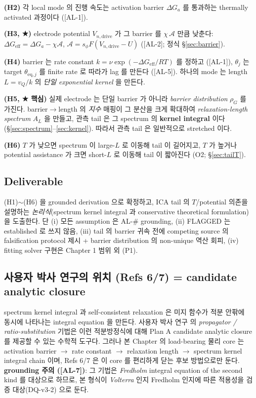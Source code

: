 \documentclass[11pt,a4paper]{article}
\newcommand{\eff}{\mathrm{eff}}
\newcommand{\eq}{\mathrm{eq}}
\newcommand{\dimedrive}{\mathrm{drive}}
\newcommand{\AL}[1]{\textsf{[AL-#1]}}
\begin{document}
\textbf{(H2)} 각 local mode 의 진행 속도는 activation barrier $\Delta G_{a}$ 를 통과하는
thermally activated 과정이다 (\AL{1}).

\textbf{(H3, ★)} electrode potential $V_{n,\dimedrive}$ 가 그 barrier 를 $\chi\,\mathcal A$
만큼 낮춘다: $\Delta G_\eff = \Delta G_a - \chi\mathcal A$, $\mathcal A=s_\phi F(V_{n,\dimedrive}-U)$
(\AL{2}; 정식 \S\ref{sec:barrier}).

\textbf{(H4)} barrier 는 rate constant $k=\nu\exp(-\Delta G_\eff/RT)$ 를 정하고 (\AL{1}),
$\theta_j$ 는 target $\theta_{\eq,j}$ 를 finite rate 로 따라가 lag 를 만든다 (\AL{5}).
하나의 mode 는 length $L=v_Q/k$ 의 \emph{단일 exponential kernel} 을 만든다.

\textbf{(H5, ★ 핵심)} 실제 electrode 는 단일 barrier 가 아니라 \emph{barrier
distribution} $\rho_G$ 를 가진다. barrier$\to$length 의 \emph{지수} 매핑이 그 분산을
크게 확대하여 \emph{relaxation-length spectrum} $A_L$ 을 만들고, 관측 tail 은 그 spectrum
의 \textbf{kernel integral} 이다 (\S\ref{sec:spectrum}--\ref{sec:kernel}). 따라서 관측
tail 은 일반적으로 stretched 이다.

\textbf{(H6)} $T$ 가 낮으면 spectrum 이 large-$L$ 로 이동해 tail 이 길어지고, $T$ 가
높거나 potential assistance 가 크면 short-$L$ 로 이동해 tail 이 짧아진다 (O2; \S\ref{sec:tailT}).

\subsection{Deliverable}\label{sec:deliverable}
(H1)$\sim$(H6) 을 grounded derivation 으로 확정하고, ICA tail 의 $T$/potential 의존을
설명하는 \emph{논리식}(spectrum kernel integral 과 conservative theoretical formulation)을 도출한다. 단 (i) 모든 assumption 은 AL-\# grounding, (ii) FLAGGED 는 established
로 쓰지 않음, (iii) tail 의 barrier 귀속 전에 competing source 의 falsification protocol
제시 + barrier distribution 의 non-unique 역산 회피, (iv) fitting solver 구현은 Chapter 1 범위 외 (P1).

\subsection{사용자 박사 연구의 위치 (Refs 6/7) = candidate analytic closure}\label{sec:phd}
spectrum kernel integral 과 self-consistent relaxation 은 미지 함수가 적분 안팎에 동시에
나타나는 integral equation 을 만든다. 사용자 박사 연구 \cite{lee2011,son2013} 의
\emph{propagator / ratio-substitution} 기법은 이런 적분방정식에 대해 Plan A candidate analytic
closure 를 제공할 수 있는 수학적 도구다. 그러나 본 Chapter 의 load-bearing 물리 core 는
activation barrier $\to$ rate constant $\to$ relaxation length $\to$ spectrum kernel integral
chain 이며, Refs 6/7 은 이 core 를 편리하게 닫는 후보 방법으로만 둔다. \textbf{grounding 주의
(\AL{7})}: 그 기법은 \emph{Fredholm} integral equation of the second kind 를 대상으로
하므로, 본 형식이 \emph{Volterra} 인지 Fredholm 인지에 따른 적용성을 검증 대상(DQ-v3-2)
으로 둔다.
\end{document}
